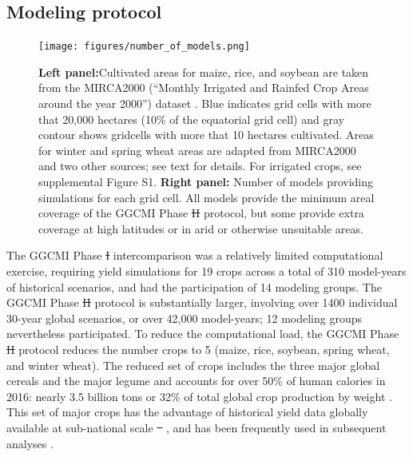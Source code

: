 \documentclass[gmd, manuscript]{copernicus} %
\providecommand{\DIFadd}[1]{{\protect\color{blue}\uwave{#1}}} %
\providecommand{\DIFdel}[1]{{\protect\color{red}\sout{#1}}}                      %
\providecommand{\DIFaddbegin}{} %
\providecommand{\DIFaddend}{} %
\providecommand{\DIFdelbegin}{} %
\providecommand{\DIFdelend}{} %
\providecommand{\DIFaddFL}[1]{\DIFadd{#1}} %
\providecommand{\DIFdelFL}[1]{\DIFdel{#1}} %
\providecommand{\DIFaddbeginFL}{} %
\providecommand{\DIFaddendFL}{} %
\providecommand{\DIFdelbeginFL}{} %
\providecommand{\DIFdelendFL}{} %
\begin{document}
\subsection{Modeling protocol}
\begin{figure}[ht]
  \centering
  \texttt{[image: figures/number\_of\_models.png]}
  \caption{
  \textbf{Left panel:}Cultivated areas for maize, rice, and soybean are taken from the MIRCA2000 (``Monthly Irrigated and Rainfed Crop Areas around the year 2000'') dataset \citep{Portmann2010}. Blue indicates grid cells with more that 20,000 hectares (10\% of the equatorial grid cell) and gray contour shows gridcells with more that 10 hectares cultivated. 
  Areas for winter and spring wheat areas are adapted from MIRCA2000 and two other sources; see text for details.  For irrigated crops, see supplemental Figure S1.
  \textbf{Right panel:} Number of models providing simulations for each grid cell.  
  All models provide the minimum areal coverage of the GGCMI Phase \DIFdelbeginFL \DIFdelFL{II }\DIFdelendFL \DIFaddbeginFL \DIFaddFL{2 }\DIFaddendFL protocol, but some provide extra coverage at high latitudes or in arid or otherwise unsuitable areas.}
  \label{fig:crop_area}
\end{figure}

The GGCMI Phase \DIFdelbegin \DIFdel{I }\DIFdelend \DIFaddbegin \DIFadd{1 }\DIFaddend intercomparison was a relatively limited computational exercise, requiring yield simulations for 19 crops across a total of 310 model-years of historical scenarios, and had the participation of 14 modeling groups.
The GGCMI Phase \DIFdelbegin \DIFdel{II }\DIFdelend \DIFaddbegin \DIFadd{2 }\DIFaddend protocol is substantially larger, involving over 1400 individual 30-year global scenarios, or over 42,000 model-years; 12 modeling groups nevertheless participated. To reduce the computational load, the GGCMI Phase \DIFdelbegin \DIFdel{II }\DIFdelend \DIFaddbegin \DIFadd{2 }\DIFaddend protocol reduces the number crops to 5 (maize, rice, soybean, spring wheat, and winter wheat). 
The reduced set of crops includes the three major global cereals and the major legume and accounts for over 50\% of human calories in 2016: nearly 3.5 billion tons or 32\% of total global crop production by weight \citep{FAOSTAT}. 
This set of major crops has the advantage of historical yield data globally available at sub-national scale \DIFdelbegin \DIFdel{\mbox{%
\citep{Ray2012,iizumi_historical_2014}}\hspace{0pt}%
}\DIFdelend \DIFaddbegin \DIFadd{\mbox{%
\citep{Ray2012,2zumi_historical_2014}}\hspace{0pt}%
}\DIFaddend , and has been frequently used in subsequent analyses \citep[e.g.][]{muller_global_2017,porwollik_spatial_2016}.
\end{document}
